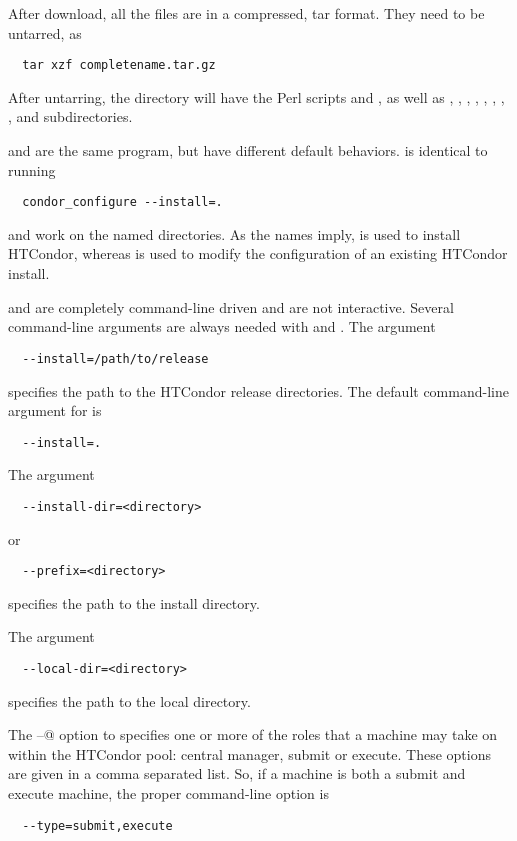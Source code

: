After download, all the files are in a compressed, tar format.
They need to be untarred, as
\begin{verbatim}
  tar xzf completename.tar.gz
\end{verbatim}
After untarring, the directory will have the Perl scripts
 and , as well as 
, , , ,
, , , ,
 and  subdirectories.

 and  are the same program, but have
different default behaviors.   is identical to
running 
\begin{verbatim}
  condor_configure --install=.
\end{verbatim}
 and  work on the named directories.
As the names imply,  is used to
install HTCondor, whereas  is used to modify the
configuration of an existing HTCondor install.

 and  are completely command-line
driven and are not interactive.  Several command-line arguments are
always needed with  and .
The argument
\begin{verbatim}
  --install=/path/to/release
\end{verbatim}
specifies the path to the HTCondor release directories.
The default command-line argument for  is 
\begin{verbatim}
  --install=.
\end{verbatim}
The argument
\begin{verbatim}
  --install-dir=<directory>
\end{verbatim}
or
\begin{verbatim}
  --prefix=<directory>
\end{verbatim}
specifies the path to the install directory.

The argument
\begin{verbatim}
  --local-dir=<directory>
\end{verbatim}
specifies the path to the local directory.

The \verb@--@ option to 
specifies one or more of the roles that a machine may take on
within the HTCondor pool: central manager, submit or execute.
These options are given in a comma separated list.
So, if a machine is both a submit and execute
machine, 
the proper command-line option is
\begin{verbatim}
  --type=submit,execute
\end{verbatim}

